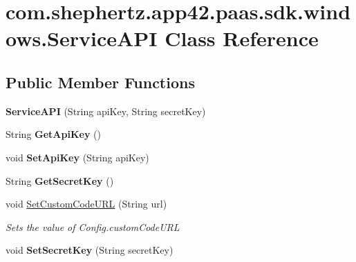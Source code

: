 \hypertarget{classcom_1_1shephertz_1_1app42_1_1paas_1_1sdk_1_1windows_1_1_service_a_p_i}{\section{com.\+shephertz.\+app42.\+paas.\+sdk.\+windows.\+Service\+A\+P\+I Class Reference}
\label{classcom_1_1shephertz_1_1app42_1_1paas_1_1sdk_1_1windows_1_1_service_a_p_i}
}
\subsection*{Public Member Functions}
\begin{DoxyCompactItemize}
\item 
\hypertarget{classcom_1_1shephertz_1_1app42_1_1paas_1_1sdk_1_1windows_1_1_service_a_p_i_ae80d7bbef9af653083f80fd0e8f1764f}{{\bfseries Service\+A\+P\+I} (String api\+Key, String secret\+Key)}\label{classcom_1_1shephertz_1_1app42_1_1paas_1_1sdk_1_1windows_1_1_service_a_p_i_ae80d7bbef9af653083f80fd0e8f1764f}

\item 
\hypertarget{classcom_1_1shephertz_1_1app42_1_1paas_1_1sdk_1_1windows_1_1_service_a_p_i_af67ff05ed4c9cca30c4dd2f6c46f10ca}{String {\bfseries Get\+Api\+Key} ()}\label{classcom_1_1shephertz_1_1app42_1_1paas_1_1sdk_1_1windows_1_1_service_a_p_i_af67ff05ed4c9cca30c4dd2f6c46f10ca}

\item 
\hypertarget{classcom_1_1shephertz_1_1app42_1_1paas_1_1sdk_1_1windows_1_1_service_a_p_i_af2c29fad50cb803fddc907ae32baca6b}{void {\bfseries Set\+Api\+Key} (String api\+Key)}\label{classcom_1_1shephertz_1_1app42_1_1paas_1_1sdk_1_1windows_1_1_service_a_p_i_af2c29fad50cb803fddc907ae32baca6b}

\item 
\hypertarget{classcom_1_1shephertz_1_1app42_1_1paas_1_1sdk_1_1windows_1_1_service_a_p_i_ae916fcc14555c5c708e77a555bbd95c3}{String {\bfseries Get\+Secret\+Key} ()}\label{classcom_1_1shephertz_1_1app42_1_1paas_1_1sdk_1_1windows_1_1_service_a_p_i_ae916fcc14555c5c708e77a555bbd95c3}

\item 
void \hyperlink{classcom_1_1shephertz_1_1app42_1_1paas_1_1sdk_1_1windows_1_1_service_a_p_i_ac99747cceec07a49d3df6de0e0546863}{Set\+Custom\+Code\+U\+R\+L} (String url)
\begin{DoxyCompactList}\small\item\em Sets the value of Config.\+custom\+Code\+U\+R\+L \end{DoxyCompactList}\item 
\hypertarget{classcom_1_1shephertz_1_1app42_1_1paas_1_1sdk_1_1windows_1_1_service_a_p_i_a786d8472e843e8060bb9ee69c5281289}{void {\bfseries Set\+Secret\+Key} (String secret\+Key)}\label{classcom_1_1shephertz_1_1app42_1_1paas_1_1sdk_1_1windows_1_1_service_a_p_i_a786d8472e843e8060bb9ee69c5281289}


\end{DoxyCompactItemize}
